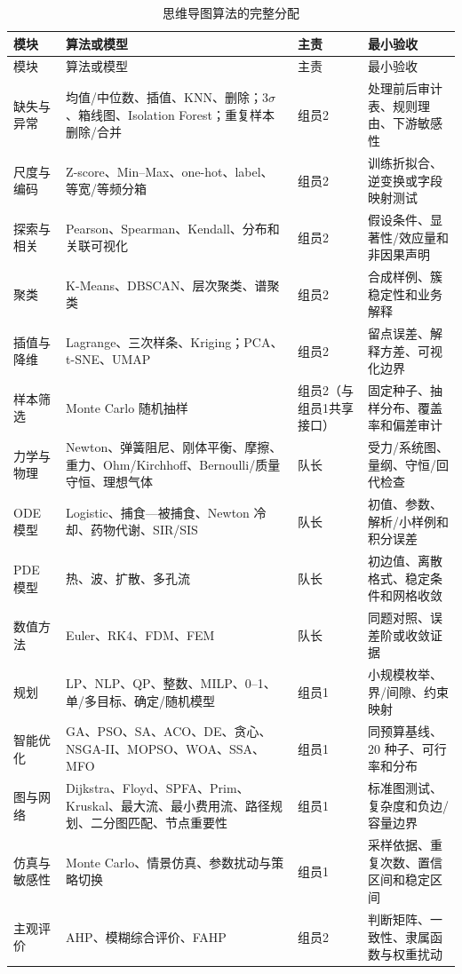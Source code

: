 \documentclass[UTF8,a4paper,12pt]{ctexart}
\begin{document}
\begin{longtable}{p{2.1cm}p{5.0cm}p{2.0cm}p{5.5cm}}
\caption{思维导图算法的完整分配}\label{tab:algorithm-owner}\\
\toprule
模块 & 算法或模型 & 主责 & 最小验收\\
\midrule
\endfirsthead
\toprule
模块 & 算法或模型 & 主责 & 最小验收\\
\midrule
\endhead
缺失与异常 & 均值/中位数、插值、KNN、删除；$3\sigma$、箱线图、Isolation Forest；重复样本删除/合并 & 组员2 & 处理前后审计表、规则理由、下游敏感性\\
尺度与编码 & Z-score、Min--Max、one-hot、label、等宽/等频分箱 & 组员2 & 训练折拟合、逆变换或字段映射测试\\
探索与相关 & Pearson、Spearman、Kendall、分布和关联可视化 & 组员2 & 假设条件、显著性/效应量和非因果声明\\
聚类 & K-Means、DBSCAN、层次聚类、谱聚类 & 组员2 & 合成样例、簇稳定性和业务解释\\
插值与降维 & Lagrange、三次样条、Kriging；PCA、t-SNE、UMAP & 组员2 & 留点误差、解释方差、可视化边界\\
样本筛选 & Monte Carlo 随机抽样 & 组员2（与组员1共享接口） & 固定种子、抽样分布、覆盖率和偏差审计\\
力学与物理 & Newton、弹簧阻尼、刚体平衡、摩擦、重力、Ohm/Kirchhoff、Bernoulli/质量守恒、理想气体 & 队长 & 受力/系统图、量纲、守恒/回代检查\\
ODE 模型 & Logistic、捕食—被捕食、Newton 冷却、药物代谢、SIR/SIS & 队长 & 初值、参数、解析/小样例和积分误差\\
PDE 模型 & 热、波、扩散、多孔流 & 队长 & 初边值、离散格式、稳定条件和网格收敛\\
数值方法 & Euler、RK4、FDM、FEM & 队长 & 同题对照、误差阶或收敛证据\\
规划 & LP、NLP、QP、整数、MILP、0--1、单/多目标、确定/随机模型 & 组员1 & 小规模枚举、界/间隙、约束映射\\
智能优化 & GA、PSO、SA、ACO、DE、贪心、NSGA-II、MOPSO、WOA、SSA、MFO & 组员1 & 同预算基线、20 种子、可行率和分布\\
图与网络 & Dijkstra、Floyd、SPFA、Prim、Kruskal、最大流、最小费用流、路径规划、二分图匹配、节点重要性 & 组员1 & 标准图测试、复杂度和负边/容量边界\\
仿真与敏感性 & Monte Carlo、情景仿真、参数扰动与策略切换 & 组员1 & 采样依据、重复次数、置信区间和稳定区间\\
主观评价 & AHP、模糊综合评价、FAHP & 组员2 & 判断矩阵、一致性、隶属函数与权重扰动\\

\end{longtable}
\end{document}
